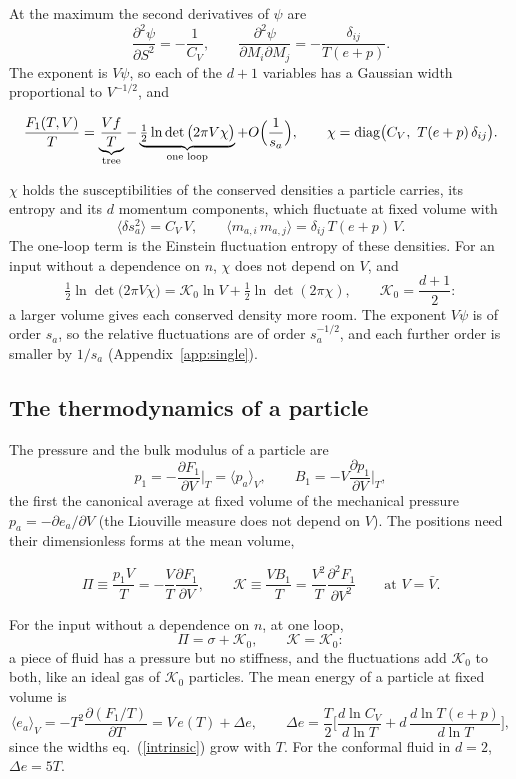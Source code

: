 \documentclass[11pt,aps,preprint,nofootinbib,superscriptaddress,tightenlines]{revtex4-2}
\newcommand{\avg}[1]{\langle #1\rangle}
\def\st{\begin{equation}}
\def\stp{\end{equation}}
\def\Eq#1{eq.~(\ref{#1})}
\def\App#1{Appendix~\ref{#1}}
\begin{document}
At the maximum the second derivatives of $\psi$ are
\st
\frac{\partial^2\psi}{\partial S^2}=-\frac1{C_V},\qquad \frac{\partial^2\psi}{\partial M_i\partial M_j}=-\frac{\delta_{ij}}{T(e+p)} .
\stp
The exponent is $V\psi$, so each of the $d+1$ variables has a Gaussian width proportional to $V^{-1/2}$, and
\begin{keyeq}
\st
\frac{F_1(T,V)}T=\underbrace{\frac{V f}T}_{\text{tree}}-\underbrace{\tfrac12\ln\det\big(2\pi V\chi\big)}_{\text{one loop}}+O\Big(\frac1{s_a}\Big),
\qquad \chi={\rm diag}\big(C_V,\ T(e+p)\,\delta_{ij}\big) .
\label{F1loop}
\stp
\end{keyeq}
$\chi$ holds the susceptibilities of the conserved densities a particle carries, its entropy and its $d$ momentum components, which fluctuate at fixed volume with
\st
\avg{\delta s_a^2}=C_V\,V,\qquad \avg{m_{a,i}\,m_{a,j}}=\delta_{ij}\,T(e+p)\,V .
\label{intrinsic}
\stp
The one-loop term is the Einstein fluctuation entropy of these densities.  For an input without a dependence on $n$, $\chi$ does not depend on $V$, and
\st
\tfrac12\ln\det\big(2\pi V\chi\big)=\mathcal K_0\ln V+\tfrac12\ln\det(2\pi\chi),\qquad \mathcal K_0=\frac{d+1}2 :
\stp
a larger volume gives each conserved density more room.  The exponent $V\psi$ is of order $s_a$, so the relative fluctuations are of order $s_a^{-1/2}$, and each
further order is smaller by $1/s_a$ (\App{app:single}).

\subsection{The thermodynamics of a particle}
\label{sec:particlethermo}

The pressure and the bulk modulus of a particle are
\st
p_1=-\frac{\partial F_1}{\partial V}\Big|_T=\avg{p_a}_V,\qquad B_1=-V\frac{\partial p_1}{\partial V}\Big|_T ,
\stp
the first the canonical average at fixed volume of the mechanical pressure $p_a=-\partial e_a/\partial V$ (the Liouville measure does not depend on $V$).  The
positions need their dimensionless forms at the mean volume,
\begin{keyeq}
\st
\Pi\equiv\frac{p_1V}T=-\frac VT\frac{\partial F_1}{\partial V},\qquad
\mathcal K\equiv\frac{VB_1}T=\frac{V^2}T\frac{\partial^2F_1}{\partial V^2}\qquad\text{at }V=\bar V .
\label{PiK}
\stp
\end{keyeq}
For the input without a dependence on $n$, at one loop,
\st
\Pi=\sigma+\mathcal K_0,\qquad \mathcal K=\mathcal K_0 :
\label{PiKloop}
\stp
a piece of fluid has a pressure but no stiffness, and the fluctuations add $\mathcal K_0$ to both, like an ideal gas of $\mathcal K_0$ particles.  The mean energy of a
particle at fixed volume is
\st
\avg{e_a}_V=-T^2\frac{\partial(F_1/T)}{\partial T}=V\,e(T)+\Delta e,\qquad
\Delta e=\frac T2\Big[\frac{d\ln C_V}{d\ln T}+d\,\frac{d\ln T(e+p)}{d\ln T}\Big] ,
\label{Deltae}
\stp
since the widths \Eq{intrinsic} grow with $T$.  For the conformal fluid in $d=2$, $\Delta e=5T$.
\end{document}
